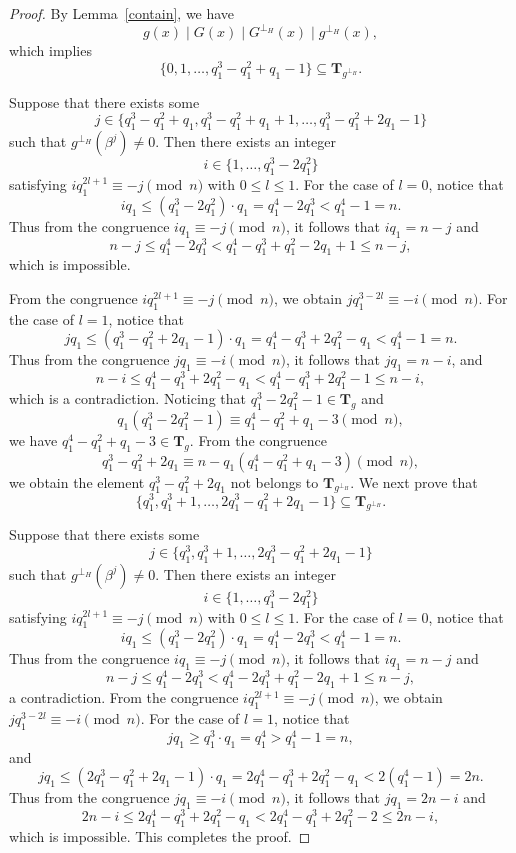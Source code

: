 \documentclass[10pt,a4paper]{amsart}
\begin{document}
\begin{proof}
By Lemma~\ref{contain}, we have
\[
g(x) \mid G(x) \mid G^{\perp_H}(x) \mid g^{\perp_H}(x),
\]
which implies
\[
\{0,1,\dots,q_1^3 - q_1^2 + q_1 - 1\} \subseteq \mathbf{T}_{g^{\perp_H}}.
\]

Suppose that there exists some
\[
j \in \{q_1^3 - q_1^2 + q_1, q_1^3 - q_1^2 + q_1 + 1, \dots, q_1^3 - q_1^2 + 2q_1 - 1\}
\]
such that $g^{\perp_H}(\beta^j) \ne 0$. Then there exists an integer
\[
i \in \{1, \dots, q_1^3 - 2q_1^2\}
\]
satisfying
\(
i q_1^{2l+1} \equiv -j \pmod{n}
\) with $0\le l \le 1$. For the case of $l = 0$, notice that
\[
i q_1 \le (q_1^3 - 2q_1^2) \cdot q_1 = q_1^4 - 2q_1^3 < q_1^4 - 1 = n.
\]
Thus from the congruence $i q_1\equiv -j \pmod n$, it follows that $i q_1 = n - j$ and
\[
n - j \le q_1^4 - 2q_1^3
< q_1^4 - q_1^3 + q_1^2 - 2q_1 + 1
\le n - j,
\]
which is impossible.

From the congruence $i q_1^{2l+1}\equiv -j \pmod n$, we obtain $j q_1^{3-2l}\equiv -i\pmod n$. For the case of $l = 1$, notice that
\[
j q_1 \le (q_1^3 - q_1^2 + 2q_1 - 1) \cdot q_1
= q_1^4 - q_1^3 + 2q_1^2 - q_1
< q_1^4 - 1 = n.
\]
Thus from the congruence $j q_1\equiv -i \pmod n$, it follows that $j q_1 = n - i$, and
\[
n - i \le q_1^4 - q_1^3 + 2q_1^2 - q_1
< q_1^4 - q_1^3 + 2q_1^2 - 1
\le n - i,
\]
which is a contradiction. Noticing that $q_1^3 - 2q_1^2 - 1 \in \mathbf{T}_g$ and
\[
q_1(q_1^3 - 2q_1^2 - 1) \equiv q_1^4 - q_1^2 + q_1 - 3 \pmod{n},
\]
we have $q_1^4 - q_1^2 + q_1 - 3 \in \mathbf{T}_g$. From the congruence
\[
q_1^3 - q_1^2 + 2q_1 \equiv n - q_1(q_1^4 - q_1^2 + q_1 - 3) \pmod{n},
\]
we obtain the element $q_1^3 - q_1^2 + 2q_1$ not belongs to $\mathbf{T}_{g^{\perp_H}}$. We next prove that
\[
\{q_1^3, q_1^3 + 1, \dots, 2q_1^3 - q_1^2 + 2q_1 - 1\} \subseteq \mathbf{T}_{g^{\perp_H}}.
\]

Suppose that there exists some
\[
j \in \{q_1^3, q_1^3 + 1, \dots, 2q_1^3 - q_1^2 + 2q_1 - 1\}
\]
such that $g^{\perp_H}(\beta^j) \ne 0$. Then there exists an integer
\[
i \in \{1, \dots, q_1^3 - 2q_1^2\}
\]
satisfying
\(
i q_1^{2l+1} \equiv -j \pmod{n}
\) with $0\le l \le 1$. For the case of $l = 0$, notice that
\[
i q_1 \le (q_1^3 - 2q_1^2) \cdot q_1 = q_1^4 - 2q_1^3 < q_1^4 - 1 = n.
\]
Thus from the congruence $i q_1\equiv -j\pmod n$, it follows that $i q_1 = n - j$ and
\[
n - j \le q_1^4 - 2q_1^3
< q_1^4 - 2q_1^3 + q_1^2 - 2q_1 + 1
\le n - j,
\]
a contradiction. From the congruence $i q_1^{2l+1}\equiv -j \pmod n$, we obtain $j q_1^{3-2l}\equiv -i\pmod n$. For the case of $l = 1$, notice that
\[
j q_1 \ge q_1^3 \cdot q_1 = q_1^4 > q_1^4 - 1 = n,
\]
and
\[
j q_1 \le (2q_1^3 - q_1^2 + 2q_1 - 1) \cdot q_1
= 2q_1^4 - q_1^3 + 2q_1^2 - q_1
< 2(q_1^4 - 1) = 2n.
\]
Thus from the congruence $j q_1\equiv -i \pmod n$, it follows that $j q_1 = 2n - i$ and
\[
2n - i \le 2q_1^4 - q_1^3 + 2q_1^2 - q_1
< 2q_1^4 - q_1^3 + 2q_1^2 - 2
\le 2n - i,
\]
which is impossible. This completes the proof.
\end{proof}
\end{document}
